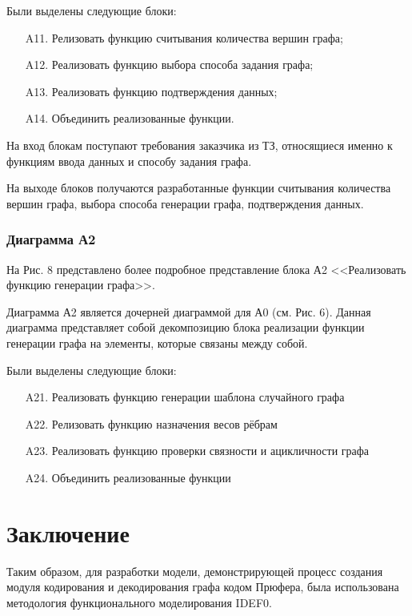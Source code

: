 \documentclass[a4paper, final]{article}
\begin{document}
Были выделены следующие блоки:
\begin{itemize}
	\item[A11.] Релизовать функцию считывания количества вершин графа;
	\item[A12.] Реализовать функцию выбора способа задания графа;
	\item[A13.] Реализовать функцию подтверждения данных;
	\item[A14.] Объединить реализованные функции.
\end{itemize} 

На вход блокам поступают требования заказчика из ТЗ, относящиеся именно к функциям ввода данных и способу 
задания графа.

На выходе блоков получаются разработанные функции считывания количества вершин графа, выбора способа генерации графа,
подтверждения данных.

\newpage
\hypertarget{img:A1}{}



\subsubsection{Диаграмма А2}
На Рис. 8 представлено более подробное представление блока А2 <<Реализовать функцию генерации графа>>.

Диаграмма А2 является дочерней диаграммой для А0 (см. Рис. 6). Данная диаграмма представляет собой декомпозицию
блока реализации функции генерации графа на элементы, которые связаны между собой. 

Были выделены следующие блоки:
\begin{itemize}
	\item[A21.] Реализовать функцию генерации шаблона случайного графа
	\item[A22.] Релизовать функцию назначения весов рёбрам
	\item[A23.] Реализовать функцию проверки связности и ацикличности графа
	\item[A24.] Объединить реализованные функции
\end{itemize} 

\newpage
\hypertarget{img:A2}{}



\cleardoublepage
{}
\newpage
{}
\section*{Заключение}
Таким образом, для разработки модели, демонстрирующей процесс создания модуля кодирования и декодирования графа кодом Прюфера,
была использована методология функционального моделирования IDEF0.
\end{document}
